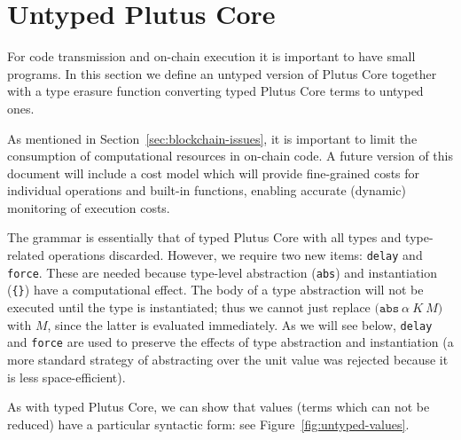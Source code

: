\documentclass[a4paper]{article}
\newcommand{\keyword}[1]{\texttt{#1}}
\newcommand{\construct}[1]{\texttt{(} #1 \texttt{)}}
\newcommand{\abs}[3]{\construct{\keyword{abs} ~ #1 ~ #2 ~ #3}}
\newcommand{\lamU}[2]{\construct{\keyword{lam} ~ #1 ~ #2        }}
\newcommand{\appU}[2]{\texttt{[} #1 ~ #2 \texttt{]}}
\newcommand{\delay}[1]{\construct{\keyword{delay} ~ #1}}
\newcommand{\force}[1]{\construct{\keyword{force} ~ #1}}
\begin{document}

\section{Untyped Plutus Core}
\label{sec:untyped-plc}
For code transmission and on-chain execution it is important to have
small programs.  In this section we define an untyped version of
Plutus Core together with a type erasure function converting typed
Plutus Core terms to untyped ones.

As mentioned in Section~\ref{sec:blockchain-issues}, it is important to
limit the consumption of computational resources in on-chain code.  A
future version of this document will include a cost model which will
provide fine-grained costs for individual operations and built-in
functions, enabling accurate (dynamic) monitoring of execution costs.



\bigskip
\noindent The grammar is essentially that of typed Plutus Core with all types
and type-related operations discarded.  However, we require two new
items: \texttt{delay} and \texttt{force}.  These are needed because
type-level abstraction (\texttt{abs}) and instantiation (\texttt{\{\}})
have a computational effect.  The body of a type abstraction will not
be executed until the type is instantiated; thus we cannot just
replace $\abs{\alpha}{K}{M}$ with $M$, since the latter is evaluated
immediately.  As we will see below, \texttt{delay} and \texttt{force}
are used to preserve the effects of type abstraction and
instantiation (a more standard strategy of abstracting over the unit value was
rejected because it is less space-efficient).%

As with typed Plutus Core, we can show that values (terms which can
not be reduced) have a particular syntactic form: see
Figure~\ref{fig:untyped-values}.
\end{document}

